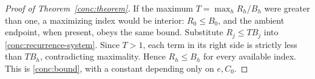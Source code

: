 \begin{proof}[Proof of Theorem~\ref{conc:theorem}]
If the maximum $T=\max_h R_h/B_h$ were greater than one, a maximizing
index would be interior: $R_0\leq B_0$, and the ambient endpoint,
when present, obeys the same bound.  Substitute $R_j\leq TB_j$ into
\eqref{conc:recurrence-system}.  Since $T>1$, each term in its right
side is strictly less than $TB_h$, contradicting maximality.  Hence
$R_h\leq B_h$ for every available index.  This is
\eqref{conc:bound}, with a constant depending only on $e,C_0$.
\end{proof}
